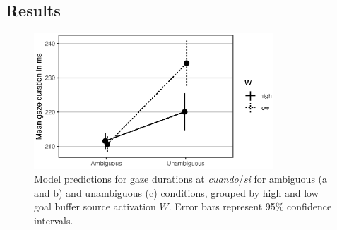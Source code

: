 \documentclass{cambridge7A}\usepackage[]{graphicx}\usepackage[]{color}
\newenvironment{knitrout}{}{} %
\begin{document}
\subsection{Results}



\begin{figure}[!htbp]
  \centering
%
\begin{knitrout}
\color{fgcolor}

{\centering \includegraphics[width=0.8\textwidth]{figures/fig-mv13modelambadv-1} 

}



\end{knitrout}
%
  \caption[Predicted gaze durations by source activation at ambiguous and unambiguous attachments.]{Model predictions for gaze durations at \textit{cuando}/\textit{si} for ambiguous (a and b) and unambiguous (c) conditions, grouped by high and low goal buffer source activation $W$. Error bars represent 95\% confidence intervals.} \label{fig:mv13model:rt}
\end{figure}
\end{document}
